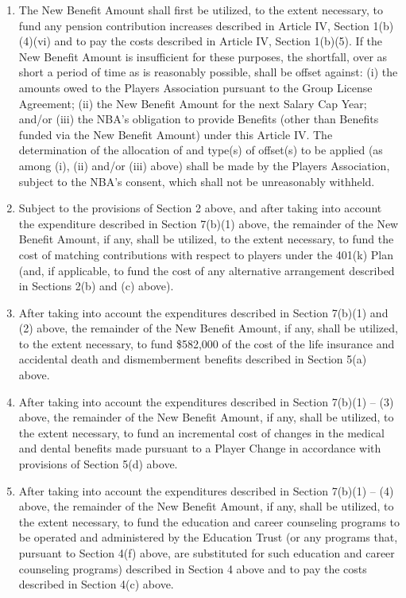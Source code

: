 \documentclass[
]{book}
\providecommand{\tightlist}{%
  \setlength{\itemsep}{0pt}\setlength{\parskip}{0pt}}
\begin{document}
\begin{enumerate}
  \begin{enumerate}
  \def\labelenumii{(\arabic{enumii})}
  \tightlist
  \item
    The New Benefit Amount shall first be utilized, to the extent necessary, to fund any pension contribution increases described in Article IV, Section 1(b)(4)(vi) and to pay the costs described in Article IV, Section 1(b)(5). If the New Benefit Amount is insufficient for these purposes, the shortfall, over as short a period of time as is reasonably possible, shall be offset against: (i) the amounts owed to the Players Association pursuant to the Group License Agreement; (ii) the New Benefit Amount for the next Salary Cap Year; and/or (iii) the NBA's obligation to provide Benefits (other than Benefits funded via the New Benefit Amount) under this Article IV. The determination of the allocation of and type(s) of offset(s) to be applied (as among (i), (ii) and/or (iii) above) shall be made by the Players Association, subject to the NBA's consent, which shall not be unreasonably withheld.
  \item
    Subject to the provisions of Section 2 above, and after taking into account the expenditure described in Section 7(b)(1) above, the remainder of the New Benefit Amount, if any, shall be utilized, to the extent necessary, to fund the cost of matching contributions with respect to players under the 401(k) Plan (and, if applicable, to fund the cost of any alternative arrangement described in Sections 2(b) and (c) above).
  \item
    After taking into account the expenditures described in Section 7(b)(1) and (2) above, the remainder of the New Benefit Amount, if any, shall be utilized, to the extent necessary, to fund \$582,000 of the cost of the life insurance and accidental death and dismemberment benefits described in Section 5(a) above.
  \item
    After taking into account the expenditures described in Section 7(b)(1) -- (3) above, the remainder of the New Benefit Amount, if any, shall be utilized, to the extent necessary, to fund an incremental cost of changes in the medical and dental benefits made pursuant to a Player Change in accordance with provisions of Section 5(d) above.
  \item
    After taking into account the expenditures described in Section 7(b)(1) -- (4) above, the remainder of the New Benefit Amount, if any, shall be utilized, to the extent necessary, to fund the education and career counseling programs to be operated and administered by the Education Trust (or any programs that, pursuant to Section 4(f) above, are substituted for such education and career counseling programs) described in Section 4 above and to pay the costs described in Section 4(c) above.

\end{enumerate}
\end{enumerate}
\end{document}
